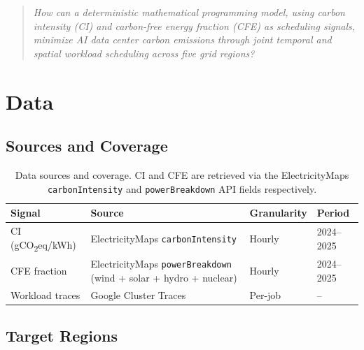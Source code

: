 \documentclass[11pt, a4paper]{article}
\begin{document}
\begin{quote}
  \itshape
  How can a deterministic mathematical programming model, using carbon intensity (CI) and carbon-free energy fraction (CFE) as scheduling signals, minimize AI data center carbon emissions through joint temporal and spatial workload scheduling across five grid regions?
\end{quote}

\section{Data}

\subsection{Sources and Coverage}

\begin{table}[h]
\centering\small
\renewcommand{\arraystretch}{1.3}
\begin{tabularx}{\linewidth}{lXll}
\toprule
\textbf{Signal} & \textbf{Source} & \textbf{Granularity} & \textbf{Period} \\
\midrule
CI (gCO\textsubscript{2}eq/kWh) & ElectricityMaps \texttt{carbonIntensity} & Hourly & 2024--2025 \\
CFE fraction & ElectricityMaps \texttt{powerBreakdown} (wind + solar + hydro + nuclear) & Hourly & 2024--2025 \\
Workload traces & Google Cluster Traces & Per-job & -- \\
\bottomrule
\end{tabularx}
\caption{Data sources and coverage. CI and CFE are retrieved via the ElectricityMaps
\texttt{carbonIntensity} and \texttt{powerBreakdown} API fields respectively.}
\end{table}

\subsection{Target Regions}
\end{document}

